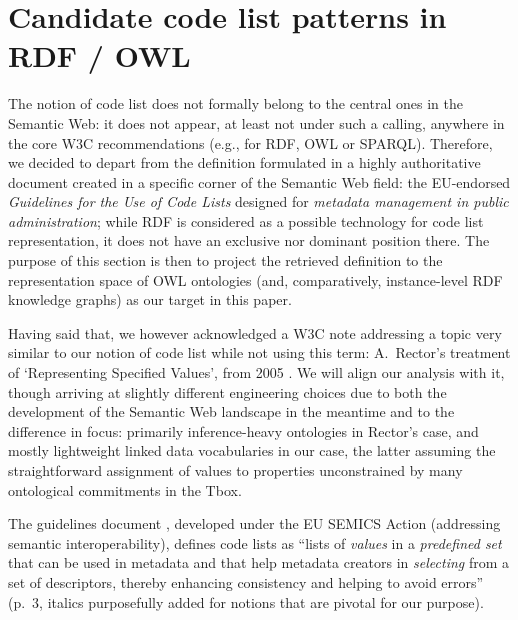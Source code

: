 \section{Candidate code list patterns in RDF / OWL}
\label{s:codelist-def}

The notion of code list does not formally belong to the central ones in the Semantic Web: it does not appear, at least not under such a calling, anywhere in the core W3C recommendations (e.g., for RDF, OWL or SPARQL). 
Therefore, we decided to depart from the definition formulated in a highly authoritative document created in a specific corner of the Semantic Web field: the EU-endorsed \emph{Guidelines for the Use of Code Lists} \cite{guide_code_list} designed for  \emph{metadata management in public administration}; while RDF is considered as a possible technology for code list representation, it does not have an exclusive nor dominant position there. 
The purpose of this section is then to project the retrieved definition to the representation space of OWL ontologies (and, comparatively, instance-level RDF knowledge graphs) as our target in this paper.

Having said that, we however acknowledged a W3C note addressing a topic very similar to our notion of code list while not using this term: A.~Rector's treatment of `Representing Specified Values', from 2005 \cite{alanrector}. 
We will align our analysis with it, though arriving at slightly different engineering choices due to both the development of the Semantic Web landscape in the meantime and to the difference in focus: primarily inference-heavy ontologies in Rector's case, and mostly lightweight linked data vocabularies in our case, the latter assuming the straightforward assignment of values to properties unconstrained by many ontological commitments in the Tbox.

The guidelines document \cite{guide_code_list}, developed under the EU SEMICS Action (addressing semantic interoperability), defines code lists as ``lists of \emph{values} in a \emph{predefined set} that can be used in metadata and that help metadata creators in \emph{selecting} from a set of descriptors, thereby enhancing consistency and helping to avoid errors'' (p.~3, italics purposefully added for notions that are pivotal for our purpose). 

